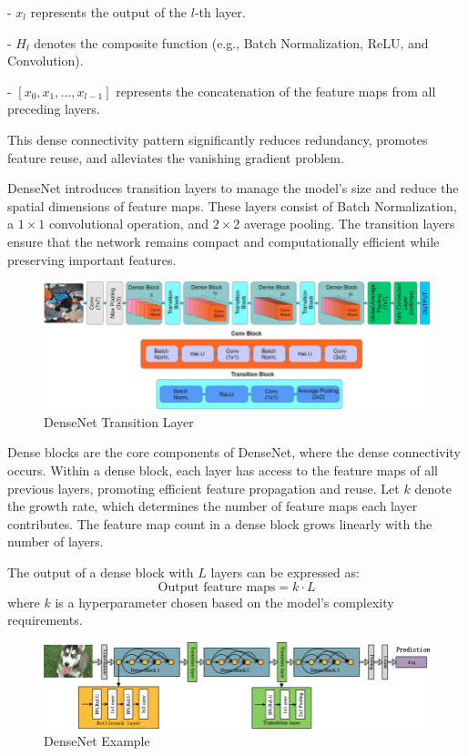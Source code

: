 - \(x_l\) represents the output of the \(l\)-th layer.

- \(H_l\) denotes the composite function (e.g., Batch Normalization, ReLU, and Convolution).

- \([x_0, x_1, ..., x_{l-1}]\) represents the concatenation of the feature maps from all preceding layers.

This dense connectivity pattern significantly reduces redundancy, promotes feature reuse, and alleviates the vanishing gradient problem.



DenseNet introduces transition layers to manage the model's size and reduce the spatial dimensions of feature maps. These layers consist of Batch Normalization, a \(1 \times 1\) convolutional operation, and \(2 \times 2\) average pooling. The transition layers ensure that the network remains compact and computationally efficient while preserving important features.

\begin{figure}[h!]
    \centering
    \includegraphics[width=1\linewidth]{images/DenseNet_transition.png}
    \caption{DenseNet Transition Layer}
    \label{fig:densenet_transition}
\end{figure}

Dense blocks are the core components of DenseNet, where the dense connectivity occurs. Within a dense block, each layer has access to the feature maps of all previous layers, promoting efficient feature propagation and reuse. Let \(k\) denote the growth rate, which determines the number of feature maps each layer contributes. The feature map count in a dense block grows linearly with the number of layers.

The output of a dense block with \(L\) layers can be expressed as:
\[
\text{Output feature maps} = k \cdot L
\]
where \(k\) is a hyperparameter chosen based on the model's complexity requirements.


\begin{figure}[h!]
    \centering
    \includegraphics[width=1\linewidth]{images/DenseNet_workflow.png}
    \caption{DenseNet Example}
    \label{fig:densenet_workflow}
\end{figure}

